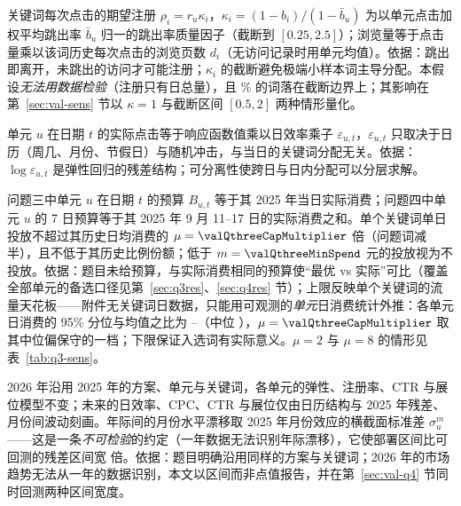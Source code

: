 \begin{assumption}[点击价值与浏览量]\label{as:value}
关键词每次点击的期望注册 $\rho_i=r_u\kappa_i$，$\kappa_i=(1-b_i)/(1-\bar b_u)$ 为以单元点击加权平均跳出率 $\bar b_u$ 归一的跳出率质量因子（截断到 $[0.25,2.5]$）；浏览量等于点击量乘以该词历史每次点击的浏览页数 $d_i$（无访问记录时用单元均值）。依据：跳出即离开，未跳出的访问才可能注册；$\kappa_i$ 的截断避免极端小样本词主导分配。本假设\emph{无法用数据检验}（注册只有日总量），且 \valKappaAtBoundPct\% 的词落在截断边界上；其影响在第~\ref{sec:val-sens} 节以 $\kappa=1$ 与截断区间 $[0.5,2]$ 两种情形量化。
\end{assumption}

\begin{assumption}[日效应可分离]\label{as:day}
单元 $u$ 在日期 $t$ 的实际点击等于响应函数值乘以日效率乘子 $\varepsilon_{u,t}$，$\varepsilon_{u,t}$ 只取决于日历（周几、月份、节假日）与随机冲击，与当日的关键词分配无关。依据：$\log\varepsilon_{u,t}$ 是弹性回归的残差结构；可分离性使跨日与日内分配可以分层求解。
\end{assumption}

\begin{assumption}[预算与投放上限]\label{as:budget}
问题三中单元 $u$ 在日期 $t$ 的预算 $B_{u,t}$ 等于其 2025 年当日实际消费；问题四中单元 $u$ 的 7 日预算等于其 2025 年 9 月 11--17 日的实际消费之和。单个关键词单日投放不超过其历史日均消费的 $\mu=\valQthreeCapMultiplier$ 倍（问题词减半），且不低于其历史比例份额；低于 $m=\valQthreeMinSpend$ 元的投放视为不投放。依据：题目未给预算，与实际消费相同的预算使“最优 vs 实际”可比（覆盖全部单元的备选口径见第~\ref{sec:q3res}、\ref{sec:q4res} 节）；上限反映单个关键词的流量天花板——附件无关键词日数据，只能用可观测的\emph{单元}日消费统计外推：各单元日消费的 95\% 分位与均值之比为 \valMinPninefiveSpendRatio--\valMaxPninefiveSpendRatio（中位 \valMedianPninefiveSpendRatio），$\mu=\valQthreeCapMultiplier$ 取其中位偏保守的一档；下限保证入选词有实际意义。$\mu=2$ 与 $\mu=8$ 的情形见表~\ref{tab:q3-sens}。
\end{assumption}

\begin{assumption}[2026 年的结构稳定性]\label{as:stable}
2026 年沿用 2025 年的方案、单元与关键词，各单元的弹性、注册率、CTR 与展位模型不变；未来的日效率、CPC、CTR 与展位仅由日历结构与 2025 年残差、月份间波动刻画。年际间的月份水平漂移取 2025 年月份效应的横截面标准差 $\sigma^{m}_u$——这是一条\emph{不可检验}的约定（一年数据无法识别年际漂移），它使部署区间比可回测的残差区间宽 \valQfourWidthInflationMedian{} 倍。依据：题目明确沿用同样的方案与关键词；2026 年的市场趋势无法从一年的数据识别，本文以区间而非点值报告，并在第~\ref{sec:val-q4} 节同时回测两种区间宽度。
\end{assumption}


